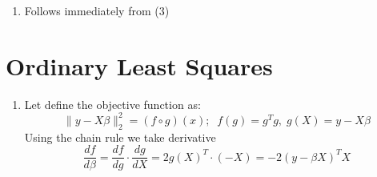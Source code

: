 \documentclass[a4paper]{article}
\begin{document}
\begin{description}
\begin{enumerate}
We prove the equivalence by induction, (1) is the induction basis, assume that $\hat{v_1}, \dots, \hat{v_{j-1}}$ are the eigen vectors corresponding to the $j-1$ largest eigen values of the matrix $X^T X$ and therefore solution to PC1-PCj-1 problems.\\
Let $v$ any feasible solution for the PCj problem, and note that the objective can be written as
\[
v^T X^T X v  = \sum_{h=j}^{p} \sum_{k=j}^{p} v^T ( v_h d_h d_k   v_k^T) v
\] 
Any feasible solution must be orthogonal to $\{v_1, \dots, v_{j-1}\}$ by the induction assumption, so $v^T\in \text{Span}(\{v_{j}, \dots, v_{p}  \})$ and we can write $v=\sum_{k=j}^{p} \alpha_k v_k;\; \sum_{k=j}^{p} \alpha_k = 1$, and see that
\[
\sum_{h=j}^{p} \sum_{k=j}^{p} v^T ( v_h d_h d_k   v_k^T) v = \sum_{h=j}^{p} \sum_{k=j}^{p} \sum_{n=j}^{p} \alpha_n \cdot \left(v_n^T ( v_h d_h d_k   v_k^T) v_n\right)
\]
By orthogonality this sum reduces to 
\[
\sum_{k=j}^{p}\alpha_k \cdot \left(v_k^T ( v_k d_k d_k   v_k^T) v_k\right) = \sum_{k=j}^{p} \alpha_k d_k^2
\].\\
We note that this is once again an eigen value problem\qed.\\

\item{}
Follows immediately from (3)
\end{enumerate}

\section{Ordinary Least Squares}
\begin{enumerate}
\item{}
Let define the objective function as:
\[
\|y-X\beta\|_2^2 = \left(f \circ g\right) (x); \;  \; f(g) = g^{T} g, \;g(X)=  y-X\beta
\]
Using the chain rule we take derivative
\[
\frac{df}{d\beta} = \frac{df}{dg} \cdot  \frac{dg}{dX} = 2g(X)^T \cdot (-X) = -2 (y-\beta X)^T X
\]


\end{enumerate}
\end{description}
\end{document}
